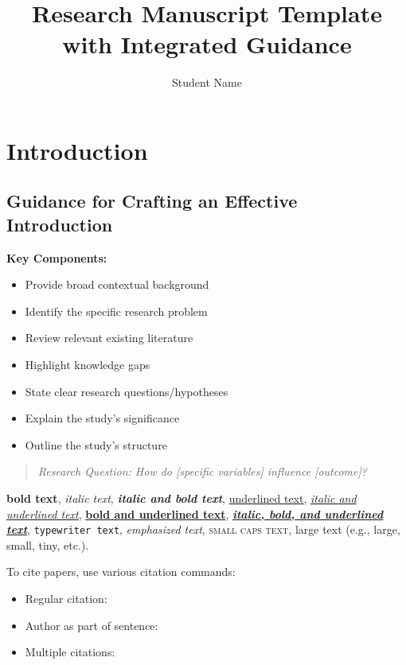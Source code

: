 \documentclass[stu,12pt,floatsintext]{apa7}
\title{Research Manuscript Template with Integrated Guidance}
\author{Student Name}
\begin{document}
\maketitle

\section{Introduction}

\subsection{Guidance for Crafting an Effective Introduction}

\textbf{Key Components:}
\begin{itemize}
    \item Provide broad contextual background
    \item Identify the specific research problem
    \item Review relevant existing literature
    \item Highlight knowledge gaps
    \item State clear research questions/hypotheses
    \item Explain the study's significance
    \item Outline the study's structure
\end{itemize}

\begin{quote}
\textit{Research Question: How do [specific variables] influence [outcome]?}
\end{quote}

\textbf{bold text}, 
\textit{italic text}, 
\textbf{\textit{italic and bold text}}, 
\underline{underlined text}, 
\underline{\textit{italic and underlined text}}, 
\underline{\textbf{bold and underlined text}}, 
\underline{\textbf{\textit{italic, bold, and underlined text}}}, 
\texttt{typewriter text}, 
\emph{emphasized text}, 
\textsc{small caps text}, 
{\Large large text} (e.g., large, small, tiny, etc.).


To cite papers, use various citation commands:
\begin{itemize}
    \item Regular citation: \cite{mujtaba2023frc}
    \item Author as part of sentence: \citet{mujtaba2024ff}
    \item Multiple citations: \citep{mujtaba2023frc, mujtaba2024ff}
\end{itemize}
\end{document}
